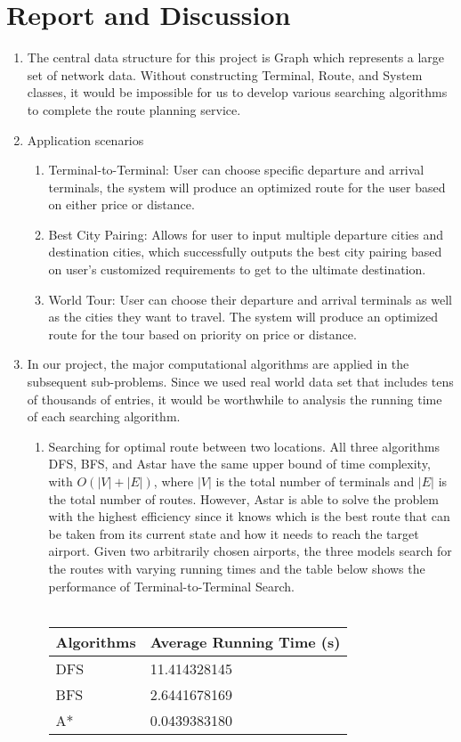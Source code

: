 \documentclass[fontsize=11pt]{article}
\begin{document}
\section*{Report and Discussion}
    \begin{enumerate}
        \item The central data structure for this project is Graph which represents a large set of network data. Without constructing Terminal, Route, and System classes, it would be impossible for us to develop various searching algorithms to complete the route planning service. 
        
        \item Application scenarios
        \begin{enumerate}
            \item Terminal-to-Terminal: User can choose specific departure and arrival terminals, the system will produce an optimized route for the user based on either price or distance. 
            \item Best City Pairing: Allows for user to input multiple departure cities and destination cities, which successfully outputs the best city pairing based on user's customized requirements to get to the ultimate destination.
            \item World Tour: User can choose their departure and arrival terminals as well as the cities they want to travel. The system will produce an optimized route for the tour based on priority on price or distance. 
        \end{enumerate}
        
        \item In our project, the major computational algorithms are applied in the subsequent sub-problems. Since we used real world data set that includes tens of thousands of entries, it would be worthwhile to analysis the running time of each searching algorithm. 
        \begin{enumerate}
            \item Searching for optimal route between two locations. All three algorithms DFS, BFS, and Astar have the same upper bound of time complexity, with $O(|V| + |E|)$, where $|V|$ is the total number of terminals and $|E|$ is the total number of routes. However, Astar is able to solve the problem with the highest efficiency since it knows which is the best route that can be taken from its current state and how it needs to reach the target airport. Given two arbitrarily chosen airports, the three models search for the routes with varying running times and the table below shows the performance of Terminal-to-Terminal Search. \\\\
            {\centering 
            \begin{tabular}{ |p{3.1cm}|p{4.1cm}|}
            \hline
            Algorithms & Average Running Time (s)\\
            \hline
            DFS & 11.414328145\\
            \hline
            BFS & 2.6441678169\\
            \hline
            A*& 0.0439383180\\
            

\end{tabular}}
\end{enumerate}
\end{enumerate}
\end{document}
